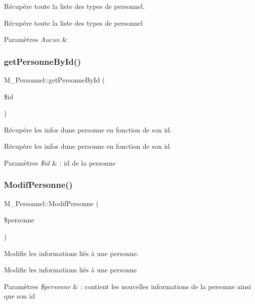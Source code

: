 Récupère toute la liste des types de personnel. 

Récupère toute la liste des types de personnel 
\begin{DoxyParams}{Paramètres}
{\em Aucun} & \\
\hline
\end{DoxyParams}
\mbox{\label{class_m___personnel_ae43e64dd0b895782af4d3c3778fe07e0}} 
\subsubsection{\texorpdfstring{get\+Personne\+By\+Id()}{getPersonneById()}}
{\footnotesize\ttfamily M\+\_\+\+Personnel\+::get\+Personne\+By\+Id (\begin{DoxyParamCaption}\item[{}]{\$id }\end{DoxyParamCaption})}



Récupère les infos d\textquotesingle{}une personne en fonction de son id. 

Récupère les infos d\textquotesingle{}une personne en fonction de son id 
\begin{DoxyParams}{Paramètres}
{\em \$id} & \+: id de la personne \\
\hline
\end{DoxyParams}
\mbox{\label{class_m___personnel_a40c4d5e76e509cfafdd586cfeb4bb37c}} 
\subsubsection{\texorpdfstring{Modif\+Personne()}{ModifPersonne()}}
{\footnotesize\ttfamily M\+\_\+\+Personnel\+::\+Modif\+Personne (\begin{DoxyParamCaption}\item[{}]{\$personne }\end{DoxyParamCaption})}



Modifie les informations liés à une personne. 

Modifie les informations liés à une personne 
\begin{DoxyParams}{Paramètres}
{\em \$personne} & \+: contient les nouvelles informations de la personne ainsi que son id \\
\hline
\end{DoxyParams}
\mbox{\label{class_m___personnel_a94c2d91e30254a22ab6ce48505f96840}} 
